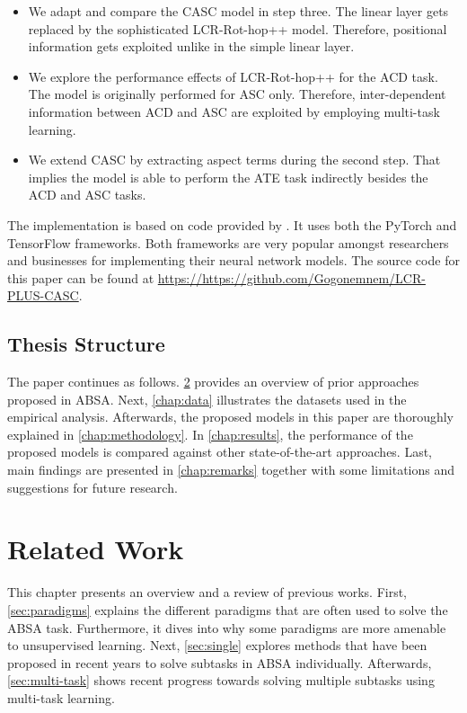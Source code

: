 \documentclass[american, oneside]{ecsgdp}
\begin{document}
\begin{itemize}
    \item We adapt and compare the CASC model in step three. The linear layer gets replaced by the sophisticated LCR-Rot-hop++ model. Therefore, positional information gets exploited unlike in the simple linear layer.
    \item We explore the performance effects of LCR-Rot-hop++ for the ACD task. The model is originally performed for ASC only. Therefore, inter-dependent information between ACD and ASC are exploited by employing multi-task learning.
    \item We extend CASC by extracting aspect terms during the second step. That implies the model is able to perform the ATE task indirectly besides the ACD and ASC tasks.
\end{itemize}

The implementation is based on code provided by \textcite{Kumar2021CASC}. It uses both the PyTorch and TensorFlow frameworks. Both frameworks are very popular amongst researchers and businesses for implementing their neural network models. The source code for this paper can be found at \url{https://https://github.com/Gogonemnem/LCR-PLUS-CASC}.

\section{Thesis Structure} \label{sec:structure}
The paper continues as follows. \cref{chap:related_work} provides an overview of prior approaches proposed in ABSA. Next, \cref{chap:data} illustrates the datasets used in the empirical analysis. Afterwards, the proposed models in this paper are thoroughly explained in \cref{chap:methodology}. In \cref{chap:results}, the performance of the proposed models is compared against other state-of-the-art approaches. Last, main findings are presented in \cref{chap:remarks} together with some limitations and suggestions for future research.

\chapter{Related Work} \label{chap:related_work}
This chapter presents an overview and a review of previous works. First, \cref{sec:paradigms} explains the different paradigms that are often used to solve the ABSA task. Furthermore, it dives into why some paradigms are more amenable to unsupervised learning. Next, \cref{sec:single} explores methods that have been proposed in recent years to solve subtasks in ABSA individually. Afterwards, \cref{sec:multi-task} shows recent progress towards solving multiple subtasks using multi-task learning.
\end{document}
